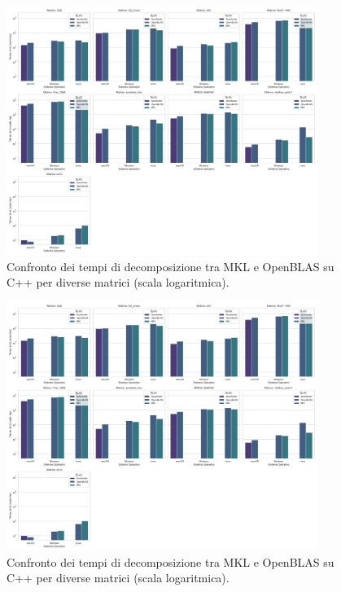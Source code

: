 \begin{figure}[H]
    \centering
    \includegraphics[width=0.9\textwidth]{images/C++/decompTime_facet_grid}
    \caption{Confronto dei tempi di decomposizione tra MKL e OpenBLAS su C++ per diverse matrici (scala logaritmica).}
    \label{fig:solve-comparison}
\end{figure}

\begin{figure}[H]
    \centering
    \includegraphics[width=0.9\textwidth]{images/C++/decompTime_facet_grid}
    \caption{Confronto dei tempi di decomposizione tra MKL e OpenBLAS su C++ per diverse matrici (scala logaritmica).}
    \label{fig:error-comparison}
\end{figure}
